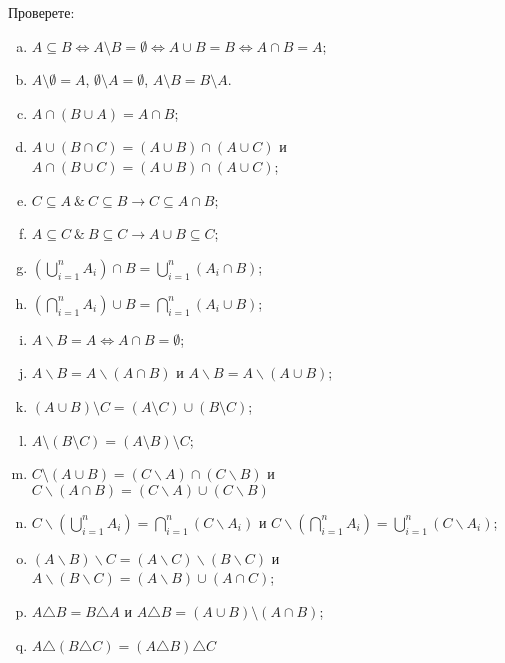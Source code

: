 \begin{problem}
  Проверете:
  \begin{enumerate}[a)]
  \item
    $A\subseteq B \iff A\setminus B = \emptyset \iff A\cup B = B \iff A\cap B = A$;
  \item
    $A\setminus \emptyset = A$, $\emptyset\setminus A=\emptyset$, $A\setminus B = B\setminus A$.
  \item
    $A\cap (B\cup A) = A \cap B$;
  \item
    $A\cup(B\cap C) = (A\cup B)\cap(A\cup C)$ и $A \cap (B \cup C) = (A \cup B) \cap (A \cup C)$;
  \item
    $C\subseteq A\ \&\ C\subseteq B \rightarrow C\subseteq A\cap B$;
  \item
    $A\subseteq C\ \&\ B\subseteq C \rightarrow A\cup B\subseteq C$;
  \item
    $(\bigcup^{n}_{i=1} A_i) \cap B = \bigcup^{n}_{i=1} (A_i \cap B)$;
  \item
    $(\bigcap^{n}_{i=1} A_i) \cup B = \bigcap^{n}_{i=1} (A_i \cup B)$;
  \item
    $A\backslash B = A \iff A\cap B = \emptyset$;
  \item
    $A\backslash B = A\backslash (A\cap B)$ и $A\backslash B = A\backslash (A\cup B)$;
  \item
    $(A\cup B)\setminus C = (A\setminus C) \cup (B\setminus C)$;
  \item
    $A\setminus (B\setminus C) = (A\setminus B)\setminus C$;
  \item
    $C\setminus (A\cup B) = (C\backslash A)\cap(C\backslash B)$ и $C \backslash (A\cap B) = (C\backslash A)\cup(C\backslash B)$
  \item
    $C\backslash(\bigcup^{n}_{i=1} A_i) = \bigcap^{n}_{i=1} (C\backslash A_i)$ и $C \backslash(\bigcap^{n}_{i=1} A_i) = \bigcup^{n}_{i=1} (C\backslash A_i)$;
  \item
    $(A\backslash B)\backslash C = (A\backslash C)\backslash(B \backslash C)$ и $A\backslash (B\backslash C) = (A\backslash B) \cup (A\cap C)$;
  \item
    $A\triangle B = B\triangle A$ и $A \triangle B = (A \cup B)\setminus (A\cap B)$;
  \item
    $A\triangle(B\triangle C) = (A\triangle B)\triangle C$

\end{enumerate}
\end{problem}
